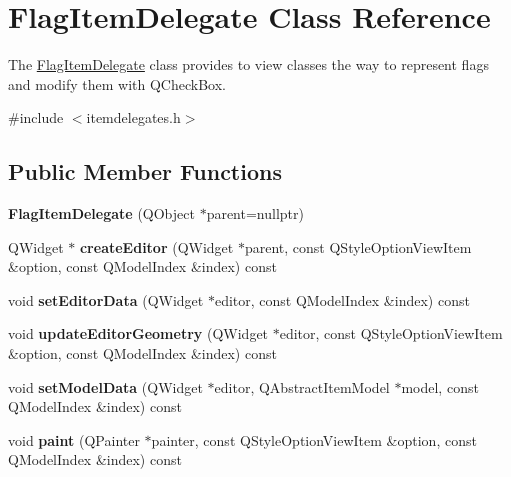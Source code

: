 \hypertarget{class_flag_item_delegate}{\section{\-Flag\-Item\-Delegate \-Class \-Reference}
\label{class_flag_item_delegate}
}


\-The \hyperlink{class_flag_item_delegate}{\-Flag\-Item\-Delegate} class provides to view classes the way to represent flags and modify them with \-Q\-Check\-Box.  




{\ttfamily \#include $<$itemdelegates.\-h$>$}

\subsection*{\-Public \-Member \-Functions}
\begin{DoxyCompactItemize}
\item 
\hypertarget{class_flag_item_delegate_a886dbd5fb7ed7c7722bdd8586f6f6f4e}{{\bfseries \-Flag\-Item\-Delegate} (\-Q\-Object $\ast$parent=nullptr)}\label{class_flag_item_delegate_a886dbd5fb7ed7c7722bdd8586f6f6f4e}

\item 
\hypertarget{class_flag_item_delegate_ac5e511eb9f27883dc81537b0fd4bb4ba}{\-Q\-Widget $\ast$ {\bfseries create\-Editor} (\-Q\-Widget $\ast$parent, const \-Q\-Style\-Option\-View\-Item \&option, const \-Q\-Model\-Index \&index) const }\label{class_flag_item_delegate_ac5e511eb9f27883dc81537b0fd4bb4ba}

\item 
\hypertarget{class_flag_item_delegate_ad6af4940b2b8ddfa92838b0bf3536992}{void {\bfseries set\-Editor\-Data} (\-Q\-Widget $\ast$editor, const \-Q\-Model\-Index \&index) const }\label{class_flag_item_delegate_ad6af4940b2b8ddfa92838b0bf3536992}

\item 
\hypertarget{class_flag_item_delegate_ad07a72c292304a40b40399b1046185ef}{void {\bfseries update\-Editor\-Geometry} (\-Q\-Widget $\ast$editor, const \-Q\-Style\-Option\-View\-Item \&option, const \-Q\-Model\-Index \&index) const }\label{class_flag_item_delegate_ad07a72c292304a40b40399b1046185ef}

\item 
\hypertarget{class_flag_item_delegate_af09a6555dc565638f142075c68da7134}{void {\bfseries set\-Model\-Data} (\-Q\-Widget $\ast$editor, \-Q\-Abstract\-Item\-Model $\ast$model, const \-Q\-Model\-Index \&index) const }\label{class_flag_item_delegate_af09a6555dc565638f142075c68da7134}

\item 
\hypertarget{class_flag_item_delegate_a899335352d13ca510da90d4ef285e313}{void {\bfseries paint} (\-Q\-Painter $\ast$painter, const \-Q\-Style\-Option\-View\-Item \&option, const \-Q\-Model\-Index \&index) const }\label{class_flag_item_delegate_a899335352d13ca510da90d4ef285e313}

\end{DoxyCompactItemize}


